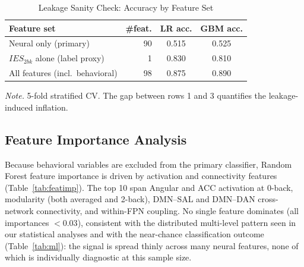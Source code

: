 \documentclass[conference]{IEEEtran}
\begin{document}
\begin{table}[t]
\caption{Leakage Sanity Check: Accuracy by Feature Set}
\label{tab:leakage}
\centering
\footnotesize
\setlength{\tabcolsep}{6pt}
\begin{tabular}{@{}l r c c@{}}
\toprule
\textbf{Feature set} & \textbf{\#feat.} & \textbf{LR acc.} & \textbf{GBM acc.} \\
\midrule
Neural only (primary)         & 90  & 0.515 & 0.525 \\
$IES_{2bk}$ alone (label proxy) & 1   & 0.830 & 0.810 \\
All features (incl.\ behavioral) & 98 & 0.875 & 0.890 \\
\bottomrule
\end{tabular}
\vspace{0.25em}

\scriptsize \textit{Note.} 5-fold stratified CV. The gap between rows 1 and 3 quantifies the leakage-induced inflation.
\end{table}

\subsection{Feature Importance Analysis}

Because behavioral variables are excluded from the primary classifier, Random Forest feature importance is driven by activation and connectivity features (Table~\ref{tab:featimp}). The top 10 span Angular and ACC activation at 0-back, modularity (both averaged and 2-back), DMN--SAL and DMN--DAN cross-network connectivity, and within-FPN coupling. No single feature dominates (all importances $<0.03$), consistent with the distributed multi-level pattern seen in our statistical analyses and with the near-chance classification outcome (Table~\ref{tab:ml}): the signal is spread thinly across many neural features, none of which is individually diagnostic at this sample size.
\end{document}
